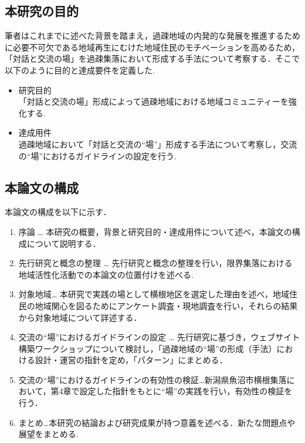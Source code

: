 \documentclass[a4paper]{jsarticle}
\begin{document}
\subsection{本研究の目的}
筆者はこれまでに述べた背景を踏まえ，過疎地域の内発的な発展を推進するために必要不可欠である地域再生にむけた地域住民のモチベーションを高めるため，「対話と交流の場」を過疎集落において形成する手法について考察する．そこで以下のように目的と達成要件を定義した.
\begin{itemize}
\item 研究目的　\\「対話と交流の場」形成によって過疎地域における地域コミュニティーを強化する.

\item 達成用件\\過疎地域において「対話と交流の“場”」形成する手法について考察し，交流の“場”におけるガイドラインの設定を行う.

\end{itemize}

\subsection{本論文の構成}
本論文の構成を以下に示す．
\begin{enumerate}
\item 序論 … 本研究の概要，背景と研究目的・達成用件について述べ，本論文の構成について説明する．
\item 先行研究と概念の整理 … 先行研究と概念の整理を行い，限界集落における地域活性化活動での本論文の位置付けを述べる.

\item 対象地域… 本研究で実践の場として横根地区を選定した理由を述べ，地域住民の地域関心を図るためにアンケート調査・現地調査を行い，それらの結果から対象地域について詳述する．
\item 交流の“場”におけるガイドラインの設定 … 先行研究に基づき，ウェブサイト構築ワークショップについて検討し，「過疎地域の“場”の形成（手法）における設計・運営の指針を定め，「パターン」にまとめる．

\item 交流の“場”におけるガイドラインの有効性の検証…新潟県魚沼市横根集落において，第4章で設定した指針をもとに“場”の実践を行い，有効性の検証を行う．
\item まとめ…本研究の結論および研究成果が持つ意義を述べる．新たな問題点や展望をまとめる.


\end{enumerate}
\end{document}
